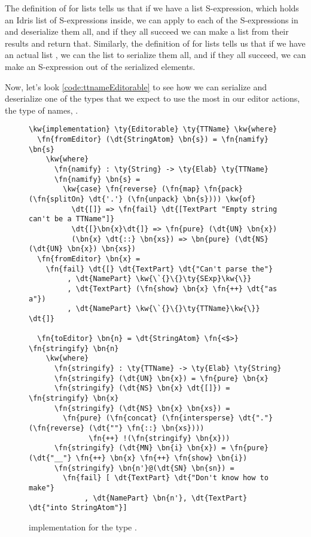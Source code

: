 The definition of  for lists tells us that if we have a list
S-expression, which holds an Idris list  of
S-expressions inside, we can apply  to each of the S-expressions
in  and deserialize them all, and if they all succeed we can make a list
from their results and return that.
Similarly, the definition of  for lists tells us that if we have an
actual list , we can  the list to serialize them all, and
if they all succeed, we can make an S-expression out of the serialized
elements.

Now, let's look \autoref{code:ttnameEditorable} to see how we can serialize and
deserialize one of the types that we expect to use the most in our editor
actions, the type of names, .

\begin{figure}[H]
\caption{ implementation for the type .}
\label{code:ttnameEditorable}
\begin{Verbatim}[framesep=2mm, label=\footnotesize{\normalfont{Idris}}, labelposition=topline]
\kw{implementation} \ty{Editorable} \ty{TTName} \kw{where}
  \fn{fromEditor} (\dt{StringAtom} \bn{s}) = \fn{namify} \bn{s}
    \kw{where}
      \fn{namify} : \ty{String} -> \ty{Elab} \ty{TTName}
      \fn{namify} \bn{s} =
        \kw{case} \fn{reverse} (\fn{map} \fn{pack} (\fn{splitOn} \dt{'.'} (\fn{unpack} \bn{s}))) \kw{of}
          \dt{[]} => \fn{fail} \dt{[TextPart "Empty string can't be a TTName"]}
          \dt{[}\bn{x}\dt{]} => \fn{pure} (\dt{UN} \bn{x})
          (\bn{x} \dt{::} \bn{xs}) => \bn{pure} (\dt{NS} (\dt{UN} \bn{x}) \bn{xs})
  \fn{fromEditor} \bn{x} =
    \fn{fail} \dt{[} \dt{TextPart} \dt{"Can't parse the"}
         , \dt{NamePart} \kw{\`{}\{}\ty{SExp}\kw{\}}
         , \dt{TextPart} (\fn{show} \bn{x} \fn{++} \dt{"as a"})
         , \dt{NamePart} \kw{\`{}\{}\ty{TTName}\kw{\}} \dt{]}

  \fn{toEditor} \bn{n} = \dt{StringAtom} \fn{<$>} \fn{stringify} \bn{n}
    \kw{where}
      \fn{stringify} : \ty{TTName} -> \ty{Elab} \ty{String}
      \fn{stringify} (\dt{UN} \bn{x}) = \fn{pure} \bn{x}
      \fn{stringify} (\dt{NS} \bn{x} \dt{[]}) = \fn{stringify} \bn{x}
      \fn{stringify} (\dt{NS} \bn{x} \bn{xs}) =
        \fn{pure} (\fn{concat} (\fn{intersperse} \dt{"."} (\fn{reverse} (\dt{""} \fn{::} \bn{xs})))
              \fn{++} !(\fn{stringify} \bn{x}))
      \fn{stringify} (\dt{MN} \bn{i} \bn{x}) = \fn{pure} (\dt{"__"} \fn{++} \bn{x} \fn{++} \fn{show} \bn{i})
      \fn{stringify} \bn{n'}@(\dt{SN} \bn{sn}) =
        \fn{fail} [ \dt{TextPart} \dt{"Don't know how to make"}
             , \dt{NamePart} \bn{n'}, \dt{TextPart} \dt{"into StringAtom"}]
\end{Verbatim}
\end{figure}


